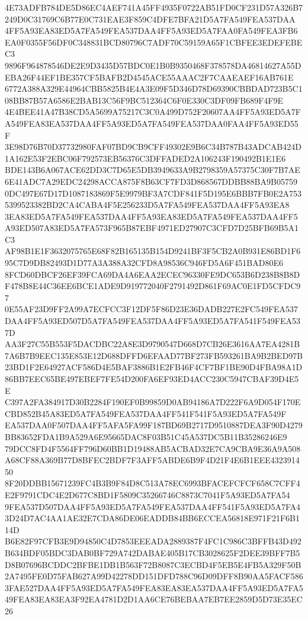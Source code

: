 \documentclass[UTF8,fontset=fandol,zihao=-4,a4paper]{ctexart}
\begin{document}
{{4E73ADFB784DE5D86EC4AEF741A45FF4935F0722AB51FD0CF231D57A326B7249D0C31769C6B77E0C731EAE3F859C4DFE7BFA21D5A7FA549FEA537DAA
4FF5A93EA83ED5A7FA549FEA537DAA4FF5A93ED5A7FAA0FA549FEA3FB6EA0F0355F56DF0C348831BCD80796C7ADF70C59159A65F1CBFEE3EDEFEBEC3
9896F964878546DE2E9D3435D57BDC0E1B0B9350468F378578DA46814627A55DEBA26F44EF1BE357CF5BAFB2D4545ACE55AAAC2F7CAAEAEF16AB761E
6772A388A329E44964CBB5825B4E4A3E09F5D346D78D69390CBBDAD723B5C108BB87B57A6586E2BAB13C56F9BC512364C6F0E330C3DF09FB689F4F9E
4E4BEE41A47B38CD5A5699A75217C3C0A499D752F20607AA4FF5A93ED5A7FA549FEA83EA537DAA4FF5A93ED5A7FA549FEA537DAA0FAA4FF5A93ED55F
3E98D76B70D37732980FAF07BD9CB9CFF49302E9B6C34B787B43ADCAB424D1A162E53F2EBC06F792573EB56376C3DFFADED2A106243F190492B1E1E6
BDE143B6A067ACE62DD3C7D65E5DB3949633A9B2798359A57375C30F7B7AE6E41ADC7A29EDC24298ACCA875F8B63CF7FD3D868567DDBB88BA9B05759
0DC497E67D17D1087183869F5E9979BF3A7CDF841F5D195E6BBB7FB0E2A7535399523382BD2CA4CABA4F5E256233D5A7FA549FEA537DAA4FF5A93EA8
3EA83ED5A7FA549FEA537DAA4FF5A93EA83ED5A7FA549FEA537DAA4FF5A93ED507A83ED5A7FA573F965B87EBF4971ED27907C3CFD7D25BFB69B5A1C3
AF98B1E1F3632075765E68F82B165135B154D9241BF3F5CB2A0B931E86BD1F695C7D9DB82493D1D77A3A388A32CFD8A98536C946FD5A6F451BAD80E6
8FCD60DBCF26EF39FCA69DA4A6EAA2ECEC96330FE9DC653B6D238B8B8DF478B8E44C36EE6BCE1ADE9D919772040F2791492D861F69AC0E1FD5CFDC97
0E55AF23D9FF2A99A7ECFCC3F12DF5F86D23E36DADB227E2FC549FEA537DAA4FF5A93ED507D5A7FA549FEA537DAA4FF5A93ED5A7FA541F549FEA537D
AA3F27C55B553F5DACDBC22A8E3D9790547D668D7CB26E3616AA7EA4281B7A6B7B9EEC135E853E12D688DFFD6EFAAD77BF273FB593261BA9B2BED97B
23BD1F2E64927ACF586D4E5BAF3886B1E2FB46F4CF7BF1BE90D4FBA98A1D86BB7EEC65BE497EBEF7FE54D200FA6EF93ED4ACC230C5947CBAF39D4E5E
C397A2FA384917D30B2284F190EF0B99859D0AB94186A7D222F6A9D054F170ECBD852B45A83ED5A7FA549FEA537DAA4FF541F541F5A93ED5A7FA549F
EA537DAA0F507DAA4FF5AFA5FA99F187BD69B2717D9510887DEA3F90D4279BB83652FDA1B9A529A6E95665DAC8F03B51C45A537DC5B11B35286246E9
79DCC8FD4F5564FF796D60BB1D19488AB5ACBAD32E7CA9CBA9E36A9A508A68CF88A369B77D8BFEC2BDF7F3AFF5ABDE6B9F4D21F4E6B1EEE432391450
8F20DDBB15671239FC4B3B9F84D8C513A78EC6993BFACEFCFCF658C7CFF4E2F9791CDC4E2D677C8BD1F5809C35266746C8873C7041F5A93ED5A7FA54
9FEA537D507DAA4FF5A93ED5A7FA549FEA537DAA4FF541F5A93ED5A7FA43D24D7AC4AA1AE32E7CDA86DE06EADDB84BB6ECCEA56818E971F21F6B114D
B6E82F97CFB3E9D94850C4D7853EEEADA2889387F4FC1C986C3BFFB43D492B634BDF05BDC3DAB0BF729A742DABAE405B17CB3028625F2DEE39BFF7B5
D8B07696BCDDC2BFBE1DB1B563F72B8087C3ECBD4F5EB5E4FB5A329F50B2A7495FE0D75FAB627A99D42278DD151DFD788C96D09DFF8B90AA5FACF586
3FAE527DAA4FF5A93ED5A7FA549FEA83EA83EA537DAA4FF5A93ED5A7FA549FEA83EA83EA3F92EA4781D2D1AA6CE76BEBAA7EB7EE2859D5D73E35EC26
}}
\end{document}
